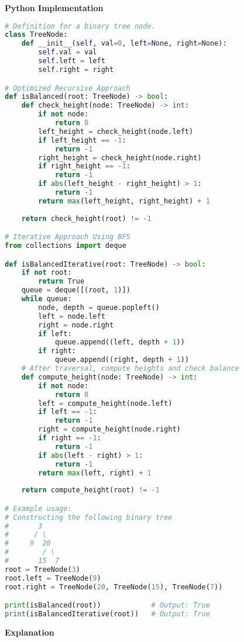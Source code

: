 \textbf{Python Implementation}

\begin{lstlisting}[language=Python, xleftmargin=0.02\textwidth, xrightmargin=0.02\textwidth]
# Definition for a binary tree node.
class TreeNode:
    def __init__(self, val=0, left=None, right=None):
        self.val = val
        self.left = left
        self.right = right

# Optimized Recursive Approach
def isBalanced(root: TreeNode) -> bool:
    def check_height(node: TreeNode) -> int:
        if not node:
            return 0
        left_height = check_height(node.left)
        if left_height == -1:
            return -1
        right_height = check_height(node.right)
        if right_height == -1:
            return -1
        if abs(left_height - right_height) > 1:
            return -1
        return max(left_height, right_height) + 1
    
    return check_height(root) != -1

# Iterative Approach Using BFS
from collections import deque

def isBalancedIterative(root: TreeNode) -> bool:
    if not root:
        return True
    queue = deque([(root, 1)])
    while queue:
        node, depth = queue.popleft()
        left = node.left
        right = node.right
        if left:
            queue.append((left, depth + 1))
        if right:
            queue.append((right, depth + 1))
    # After traversal, compute heights and check balance
    def compute_height(node: TreeNode) -> int:
        if not node:
            return 0
        left = compute_height(node.left)
        if left == -1:
            return -1
        right = compute_height(node.right)
        if right == -1:
            return -1
        if abs(left - right) > 1:
            return -1
        return max(left, right) + 1
    
    return compute_height(root) != -1

# Example usage:
# Constructing the following binary tree
#       3
#      / \
#     9  20
#        / \
#       15  7
root = TreeNode(3)
root.left = TreeNode(9)
root.right = TreeNode(20, TreeNode(15), TreeNode(7))

print(isBalanced(root))            # Output: True
print(isBalancedIterative(root))   # Output: True
\end{lstlisting}

\textbf{Explanation}

